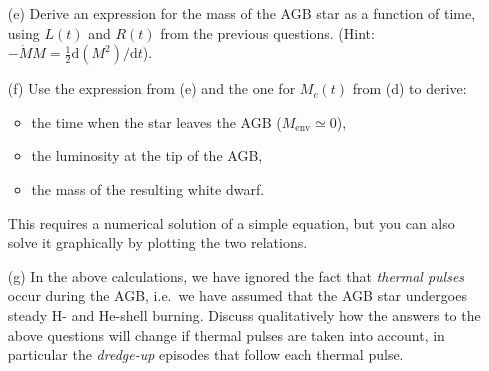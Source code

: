 \documentclass[a4paper,11pt]{article}
\newcommand\der{\ensuremath{\mathrm{d}}}
\begin{document}
\begin{enumerate}

\item[(e)] Derive an expression for the mass of the AGB star as a function of
  time, using $L(t)$ and $R(t)$ from the previous questions.
  (Hint: $-\dot{M} M = \frac{1}{2}\der(M^2)/\der t$).
      
\item[(f)] Use the expression from (e) and the one for $M_c(t)$ from
  (d) to derive:
  \begin{itemize}

  \item the time when the star leaves the AGB ($M_\mathrm{env}\simeq
    0$),

  \item the luminosity at the tip of the AGB,

  \item the mass of the resulting white dwarf.

  \end{itemize}
  This requires a numerical solution of a simple equation, but you can
  also solve it graphically by plotting the two relations.
     
\item[(g)] In the above calculations, we have ignored the fact that \emph{thermal pulses} occur during the AGB, i.e.\ we have assumed that the AGB star undergoes steady H- and He-shell burning.  Discuss qualitatively how the answers to the above questions will change if thermal pulses are taken into account, in particular the \emph{dredge-up} episodes that follow each thermal pulse.
	
\end{enumerate} 
            
\end{document}

